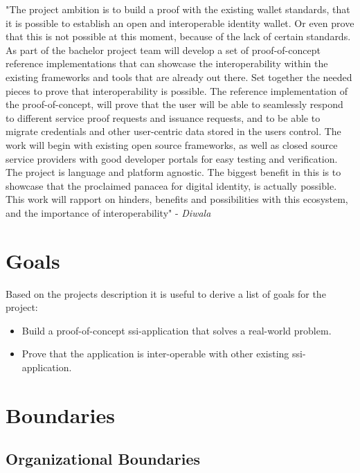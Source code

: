 "The project ambition is to build a proof with the existing wallet standards, that it is possible to establish an open and interoperable identity wallet. Or even prove that this is not possible at this moment, because of the lack of certain standards. As part of the bachelor project team will develop a set of proof-of-concept reference implementations that can showcase the interoperability within the existing frameworks and tools that are already out there. Set together the needed pieces to prove that interoperability is possible. The reference implementation of the proof-of-concept, will prove that the user will be able to seamlessly respond to different service proof requests and issuance requests, and to be able to migrate credentials and other user-centric data stored in the users control. The work will begin with existing open source frameworks, as well as closed source service providers with good developer portals for easy testing and verification. The project is language and platform agnostic. The biggest benefit in this is to showcase that the proclaimed panacea for digital identity, is actually possible. This work will rapport on hinders, benefits and possibilities with this ecosystem, and the importance of interoperability" \cite{ProjectDescription} - \textit{Diwala}






\section{Goals}

Based on the projects description it is useful to derive a list of goals for the project:

\begin{itemize}
    \item Build a proof-of-concept \acrshort{ssi}-application that solves a real-world problem.
    \item Prove that the application is inter-operable with other existing \acrshort{ssi}-application.
\end{itemize}




\section{Boundaries}



\subsection{Organizational Boundaries}

